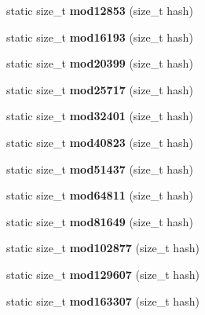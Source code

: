 \begin{DoxyCompactItemize}
\item 
static size\+\_\+t {\bfseries mod12853} (size\+\_\+t hash)\label{structska_1_1prime__number__hash__policy_a0344e9af15e7488f83efc845fd2e6bcd}

\item 
static size\+\_\+t {\bfseries mod16193} (size\+\_\+t hash)\label{structska_1_1prime__number__hash__policy_a968793384ed9ef0171bcb057ed42337a}

\item 
static size\+\_\+t {\bfseries mod20399} (size\+\_\+t hash)\label{structska_1_1prime__number__hash__policy_aa1b5839a21759fa112eedd65264ef617}

\item 
static size\+\_\+t {\bfseries mod25717} (size\+\_\+t hash)\label{structska_1_1prime__number__hash__policy_afeab6d5dcacdaf736d4972915398096b}

\item 
static size\+\_\+t {\bfseries mod32401} (size\+\_\+t hash)\label{structska_1_1prime__number__hash__policy_a64b9b40985fd79e54a3bd1e6378f5e77}

\item 
static size\+\_\+t {\bfseries mod40823} (size\+\_\+t hash)\label{structska_1_1prime__number__hash__policy_a0f8d6844e667972f7726672c82de3bef}

\item 
static size\+\_\+t {\bfseries mod51437} (size\+\_\+t hash)\label{structska_1_1prime__number__hash__policy_ab7d5cea78bffcac78f9197ef8797c92e}

\item 
static size\+\_\+t {\bfseries mod64811} (size\+\_\+t hash)\label{structska_1_1prime__number__hash__policy_abf329eeba30aae5deb594cd82668f200}

\item 
static size\+\_\+t {\bfseries mod81649} (size\+\_\+t hash)\label{structska_1_1prime__number__hash__policy_a0fa2b4ba20d67ae91e8bccb9bb24d29d}

\item 
static size\+\_\+t {\bfseries mod102877} (size\+\_\+t hash)\label{structska_1_1prime__number__hash__policy_aeee1369c3bcbf482389bc6d3602f65b8}

\item 
static size\+\_\+t {\bfseries mod129607} (size\+\_\+t hash)\label{structska_1_1prime__number__hash__policy_a1307177624372139556de2408e38e203}

\item 
static size\+\_\+t {\bfseries mod163307} (size\+\_\+t hash)\label{structska_1_1prime__number__hash__policy_a3170fcc205243a430c671e60310cdd98}


\end{DoxyCompactItemize}
